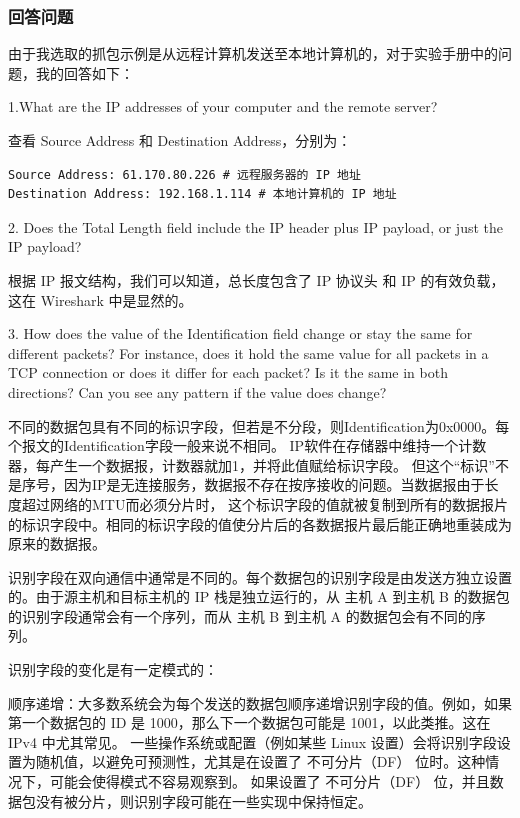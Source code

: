 \documentclass[14pt,a4paper,UTF8,twoside]{article}
\begin{document}
\subsubsection{回答问题}
由于我选取的抓包示例是从远程计算机发送至本地计算机的，对于实验手册中的问题，我的回答如下：

1.What are the IP addresses of your computer and the remote server?

查看 Source Address 和 Destination Address，分别为：

\begin{lstlisting}
Source Address: 61.170.80.226 # 远程服务器的 IP 地址
Destination Address: 192.168.1.114 # 本地计算机的 IP 地址
\end{lstlisting}

\vspace{0.5cm}

2. Does the Total Length field include the IP header plus IP payload, or just the IP payload?

根据 IP 报文结构，我们可以知道，总长度包含了 IP 协议头 和 IP 的有效负载，这在 Wireshark 中是显然的。

\vspace{0.5cm}

3. How does the value of the Identification field change or stay the same for different packets? 
For instance, does it hold the same value for all packets in a TCP connection or does it differ 
for each packet? Is it the same in both directions? Can you see any pattern if the value does 
change?

不同的数据包具有不同的标识字段，但若是不分段，则Identification为0x0000。每个报文的Identification字段一般来说不相同。
IP软件在存储器中维持一个计数器，每产生一个数据报，计数器就加1，并将此值赋给标识字段。
但这个“标识”不是序号，因为IP是无连接服务，数据报不存在按序接收的问题。当数据报由于长度超过网络的MTU而必须分片时，
这个标识字段的值就被复制到所有的数据报片的标识字段中。相同的标识字段的值使分片后的各数据报片最后能正确地重装成为原来的数据报。

识别字段在双向通信中通常是不同的。每个数据包的识别字段是由发送方独立设置的。由于源主机和目标主机的 IP 栈是独立运行的，从 主机 A 到主机 B 的数据包的识别字段通常会有一个序列，而从 主机 B 到主机 A 的数据包会有不同的序列。

识别字段的变化是有一定模式的：

顺序递增：大多数系统会为每个发送的数据包顺序递增识别字段的值。例如，如果第一个数据包的 ID 是 1000，那么下一个数据包可能是 1001，以此类推。这在 IPv4 中尤其常见。
一些操作系统或配置（例如某些 Linux 设置）会将识别字段设置为随机值，以避免可预测性，尤其是在设置了 不可分片（DF） 位时。这种情况下，可能会使得模式不容易观察到。
如果设置了 不可分片（DF） 位，并且数据包没有被分片，则识别字段可能在一些实现中保持恒定。
\end{document}
